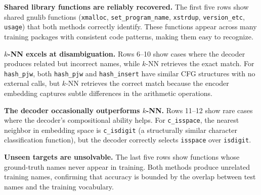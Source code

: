 \documentclass[sigconf,nonacm]{acmart}
\begin{document}
\textbf{Shared library functions are reliably recovered.} The first five rows show shared gnulib functions (\texttt{xmalloc}, \texttt{set\_program\_name}, \texttt{xstrdup}, \texttt{version\_etc}, \texttt{usage}) that both methods correctly identify. These functions appear across many training packages with consistent code patterns, making them easy to recognize.

\textbf{$k$-NN excels at disambiguation.} Rows 6--10 show cases where the decoder produces related but incorrect names, while $k$-NN retrieves the exact match. For \texttt{hash\_pjw}, both \texttt{hash\_pjw} and \texttt{hash\_insert} have similar CFG structures with no external calls, but $k$-NN retrieves the correct match because the encoder embedding captures subtle differences in the arithmetic operations.

\textbf{The decoder occasionally outperforms $k$-NN.} Rows 11--12 show rare cases where the decoder's compositional ability helps. For \texttt{c\_isspace}, the nearest neighbor in embedding space is \texttt{c\_isdigit} (a structurally similar character classification function), but the decoder correctly selects \texttt{isspace} over \texttt{isdigit}.

\textbf{Unseen targets are unsolvable.} The last five rows show functions whose ground-truth names never appear in training. Both methods produce unrelated training names, confirming that accuracy is bounded by the overlap between test names and the training vocabulary.
\end{document}
